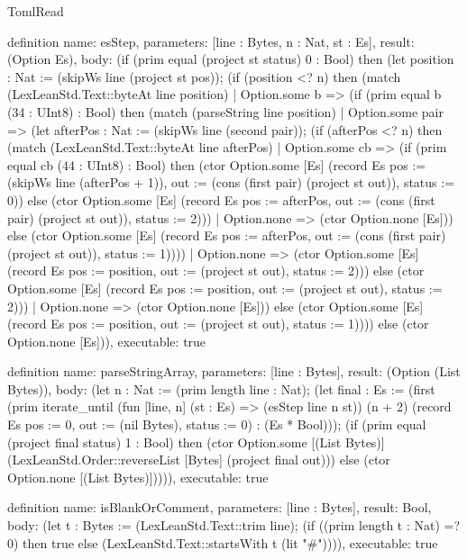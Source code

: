 \begin{lexlean}{TomlRead}
\begin{semanticmodule}
definition{
  name: esStep,
  parameters: [line : Bytes, n : Nat, st : Es],
  result: (Option Es),
  body: (if (prim equal (project st status) 0 : Bool) then (let position : Nat := (skipWs line (project st pos)); (if (position <? n) then (match (LexLeanStd.Text::byteAt line position)
    | Option.some b => (if (prim equal b (34 : UInt8) : Bool) then (match (parseString line position)
      | Option.some pair => (let afterPos : Nat := (skipWs line (second pair)); (if (afterPos <? n) then (match (LexLeanStd.Text::byteAt line afterPos)
        | Option.some cb => (if (prim equal cb (44 : UInt8) : Bool) then (ctor Option.some [Es] (record Es {pos := (skipWs line (afterPos + 1)), out := (cons (first pair) (project st out)), status := 0})) else (ctor Option.some [Es] (record Es {pos := afterPos, out := (cons (first pair) (project st out)), status := 2})))
        | Option.none => (ctor Option.none [Es])) else (ctor Option.some [Es] (record Es {pos := afterPos, out := (cons (first pair) (project st out)), status := 1}))))
      | Option.none => (ctor Option.some [Es] (record Es {pos := position, out := (project st out), status := 2}))) else (ctor Option.some [Es] (record Es {pos := position, out := (project st out), status := 2})))
    | Option.none => (ctor Option.none [Es])) else (ctor Option.some [Es] (record Es {pos := position, out := (project st out), status := 1})))) else (ctor Option.none [Es])),
  executable: true
}

definition{
  name: parseStringArray,
  parameters: [line : Bytes],
  result: (Option (List Bytes)),
  body: (let n : Nat := (prim length line : Nat); (let final : Es := (first (prim iterate_until (fun [line, n] (st : Es) => (esStep line n st)) (n + 2) (record Es {pos := 0, out := (nil Bytes), status := 0}) : (Es * Bool))); (if (prim equal (project final status) 1 : Bool) then (ctor Option.some [(List Bytes)] (LexLeanStd.Order::reverseList [Bytes] (project final out))) else (ctor Option.none [(List Bytes)])))),
  executable: true
}

definition{
  name: isBlankOrComment,
  parameters: [line : Bytes],
  result: Bool,
  body: (let t : Bytes := (LexLeanStd.Text::trim line); (if ((prim length t : Nat) =? 0) then true else (LexLeanStd.Text::startsWith t (lit "#")))),
  executable: true
}


\end{semanticmodule}
\end{lexlean}
